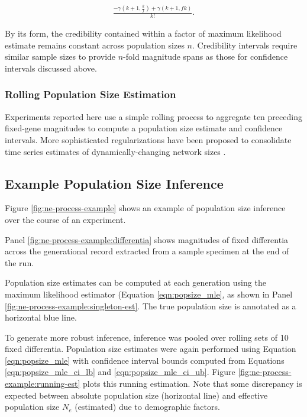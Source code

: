 \begin{align*}
\frac{- \gamma(k + 1, \frac{k}{f}) + \gamma(k + 1, f k)}{k!}.
\end{align*}

By its form, the credibility contained within a factor of maximum likelihood estimate remains constant across population sizes $n$.
Credibility intervals require similar sample sizes to provide $n$-fold magnitude spans as those for confidence intervals discussed above.

\subsubsection{Rolling Population Size Estimation} \label{sec:rolling_estimation}

Experiments reported here use a simple rolling process to aggregate ten preceding fixed-gene magnitudes to compute a population size estimate and confidence intervals.
More sophisticated regularizations have been proposed to consolidate time series estimates of dynamically-changing network sizes \citep{hakan2012distributed}.

\subsection{Example Population Size Inference}
\label{sec:ne-process-example}



Figure \ref{fig:ne-process-example} shows an example of population size inference over the course of an experiment.

Panel \ref{fig:ne-process-example:differentia} shows magnitudes of fixed differentia across the generational record extracted from a sample specimen at the end of the run.

Population size estimates can be computed at each generation using the maximum likelihood estimator (Equation \ref{eqn:popsize_mle}, as shown in Panel \ref{fig:ne-process-example:singleton-est}.
The true population size is annotated as a horizontal blue line.

To generate more robust inference, inference was pooled over rolling sets of 10 fixed differentia.
Population size estimates were again performed using Equation \ref{eqn:popsize_mle} with confidence interval bounds computed from Equations \ref{eqn:popsize_mle_ci_lb} and \ref{eqn:popsize_mle_ci_ub}.
Figure \ref{fig:ne-process-example:running-est} plots this running estimation.
Note that some discrepancy is expected between absolute population size (horizontal line) and effective population size $N_e$ (estimated) due to demographic factors.

